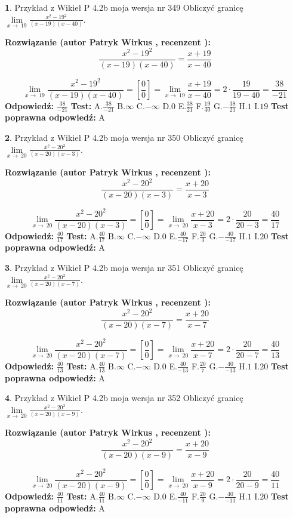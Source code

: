 \documentclass[12pt, a4paper]{article}
\theoremstyle{definition} %
\newtheorem{zad}{}
\newcommand{\zadStart}[1]{\begin{zad}#1\newline}
\newcommand{\zadStop}{\end{zad}}
\newcommand{\rozwStart}[2]{\noindent \textbf{Rozwiązanie (autor #1 , recenzent #2): }\newline}
\newcommand{\rozwStop}{\newline}
\newcommand{\odpStart}{\noindent \textbf{Odpowiedź:}\newline}
\newcommand{\odpStop}{\newline}
\newcommand{\testStart}{\noindent \textbf{Test:}\newline}
\newcommand{\testStop}{\newline}
\newcommand{\kluczStart}{\noindent \textbf{Test poprawna odpowiedź:}\newline}
\newcommand{\kluczStop}{\newline}
\begin{document}
\zadStart{Przykład z Wikieł P 4.2b moja wersja nr 349}
Obliczyć granicę $\lim\limits_{x\to\ 19}\frac{x^{2}-19^{2}}{(x-19)(x-40)}$.
\zadStop
\rozwStart{Patryk Wirkus}{}
$$\frac{x^{2}-19^{2}}{(x-19)(x-40)}=\frac{x+19}{x-40}$$

$$\lim\limits_{x\to\ 19}\frac{x^{2}-19^{2}}{(x-19)(x-40)}=[\frac{0}{0}]=\lim\limits_{x\to\ 19}\frac{x+19}{x-40}=2 \cdot \frac{19}{19-40} = \frac{38}{-21}$$
\rozwStop
\odpStart
$\frac{38}{-21}$
\odpStop
\testStart
A.$\frac{38}{-21}$
B.$\infty$
C.$-\infty$
D.$0$
E.$\frac{38}{21}$
F.$\frac{19}{40}$
G.$-\frac{38}{21}$
H.$1$
I.$19$
\testStop
\kluczStart
A
\kluczStop



\zadStart{Przykład z Wikieł P 4.2b moja wersja nr 350}
Obliczyć granicę $\lim\limits_{x\to\ 20}\frac{x^{2}-20^{2}}{(x-20)(x-3)}$.
\zadStop
\rozwStart{Patryk Wirkus}{}
$$\frac{x^{2}-20^{2}}{(x-20)(x-3)}=\frac{x+20}{x-3}$$

$$\lim\limits_{x\to\ 20}\frac{x^{2}-20^{2}}{(x-20)(x-3)}=[\frac{0}{0}]=\lim\limits_{x\to\ 20}\frac{x+20}{x-3}=2 \cdot \frac{20}{20-3} = \frac{40}{17}$$
\rozwStop
\odpStart
$\frac{40}{17}$
\odpStop
\testStart
A.$\frac{40}{17}$
B.$\infty$
C.$-\infty$
D.$0$
E.$\frac{40}{-17}$
F.$\frac{20}{3}$
G.$-\frac{40}{-17}$
H.$1$
I.$20$
\testStop
\kluczStart
A
\kluczStop



\zadStart{Przykład z Wikieł P 4.2b moja wersja nr 351}
Obliczyć granicę $\lim\limits_{x\to\ 20}\frac{x^{2}-20^{2}}{(x-20)(x-7)}$.
\zadStop
\rozwStart{Patryk Wirkus}{}
$$\frac{x^{2}-20^{2}}{(x-20)(x-7)}=\frac{x+20}{x-7}$$

$$\lim\limits_{x\to\ 20}\frac{x^{2}-20^{2}}{(x-20)(x-7)}=[\frac{0}{0}]=\lim\limits_{x\to\ 20}\frac{x+20}{x-7}=2 \cdot \frac{20}{20-7} = \frac{40}{13}$$
\rozwStop
\odpStart
$\frac{40}{13}$
\odpStop
\testStart
A.$\frac{40}{13}$
B.$\infty$
C.$-\infty$
D.$0$
E.$\frac{40}{-13}$
F.$\frac{20}{7}$
G.$-\frac{40}{-13}$
H.$1$
I.$20$
\testStop
\kluczStart
A
\kluczStop



\zadStart{Przykład z Wikieł P 4.2b moja wersja nr 352}
Obliczyć granicę $\lim\limits_{x\to\ 20}\frac{x^{2}-20^{2}}{(x-20)(x-9)}$.
\zadStop
\rozwStart{Patryk Wirkus}{}
$$\frac{x^{2}-20^{2}}{(x-20)(x-9)}=\frac{x+20}{x-9}$$

$$\lim\limits_{x\to\ 20}\frac{x^{2}-20^{2}}{(x-20)(x-9)}=[\frac{0}{0}]=\lim\limits_{x\to\ 20}\frac{x+20}{x-9}=2 \cdot \frac{20}{20-9} = \frac{40}{11}$$
\rozwStop
\odpStart
$\frac{40}{11}$
\odpStop
\testStart
A.$\frac{40}{11}$
B.$\infty$
C.$-\infty$
D.$0$
E.$\frac{40}{-11}$
F.$\frac{20}{9}$
G.$-\frac{40}{-11}$
H.$1$
I.$20$
\testStop
\kluczStart
A
\kluczStop
\end{document}
